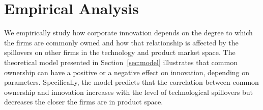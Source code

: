 \documentclass[12pt]{article}
\begin{document}
\section{Empirical Analysis}
\label{sec:results}


We empirically study how corporate innovation depends on the degree to which the firms are commonly owned and how that relationship is affected by the spillovers on other firms in the technology and product market space. The theoretical model presented in Section~\ref{sec:model} illustrates that common ownership can have a positive or a negative effect on innovation, depending on parameters. Specifically, the model predicts that the correlation between common ownership and innovation increases with the level of technological spillovers but decreases the closer the firms are in product space.





\end{document}
